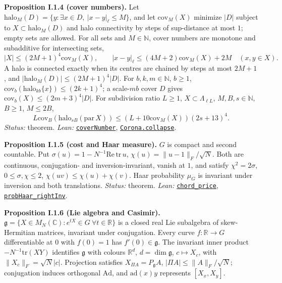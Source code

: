 \documentclass[
  letterpaper,
  11pt]{article}
\begin{document}
\textbf{Proposition I.1.4 (cover numbers).} Let
\(\mathrm{halo}_M(D)=\{y:\exists x\in D,\ |x-y|_\ell\le M\}\), and let
\(\mathrm{cov}_M(X)\) minimize \(|D|\) subject to
\(X\subset\mathrm{halo}_M(D)\) and halo connectivity by steps of
sup-distance at most \(1\); empty sets are allowed. For all sets and
\(M\in\mathbb N\), cover numbers are monotone and subadditive for
intersecting sets,
\[|X|\le(2M+1)^4\mathrm{cov}_M(X),\qquad |x-y|_\ell\le(4M+2)\mathrm{cov}_M(X)+2M\quad(x,y\in X).\]
A halo is connected exactly when its centres are chained by steps at
most \(2M+1\), and \(|\mathrm{halo}_M(D)|\le(2M+1)^4|D|\). For
\(b,k,m\in\mathbb N\), \(b\ge1\),
\(\mathrm{cov}_b(\mathrm{halo}_{kb}\{x\})\le(2k+1)^4\); a scale-\(mb\)
cover \(D\) gives \(\mathrm{cov}_b(X)\le(2m+3)^4|D|\). For subdivision
ratio \(L\ge1\), \(X\subset\Lambda_{\ell L}\), \(M,B,s\in\mathbb N\),
\(B\ge1\), \(M\le2B\),
\[L\mathrm{cov}_B(\mathrm{halo}_{sB}(\mathrm{par}\,X))\le(L+10\mathrm{cov}_M(X))(2s+13)^4.\]
\emph{Status:} theorem. \emph{Lean:}
\href{https://github.com/yang-mills-group/OpenAI-YM-20261028/blob/3456e5e75cf8d4cd558955a5c7638fba2d68f464/YM/Lattice/Support.lean\#L69-L71}{\texttt{coverNumber}},
\href{https://github.com/yang-mills-group/OpenAI-YM-20261028/blob/3456e5e75cf8d4cd558955a5c7638fba2d68f464/YM/Corona/Spend.lean\#L73-L105}{\texttt{Corona.collapse}}.

\textbf{Proposition I.1.5 (cost and Haar measure).} \(G\) is compact and
second countable. Put \(\sigma(u)=1-N^{-1}\mathrm{Re}\,\mathrm{tr}\,u\),
\(\chi(u)=\|u-1\|_F/\sqrt N\). Both are continuous, conjugation- and
inversion-invariant, vanish at \(1\), and satisfy \(\chi^2=2\sigma\),
\(0\le\sigma,\chi\le2\), \(\chi(uv)\le\chi(u)+\chi(v)\). Haar
probability \(\mu_G\) is invariant under inversion and both
translations. \emph{Status:} theorem. \emph{Lean:}
\href{https://github.com/yang-mills-group/OpenAI-YM-20261028/blob/3456e5e75cf8d4cd558955a5c7638fba2d68f464/YM/Gauge/MatrixGroup.lean\#L117-L126}{\texttt{chord\_price}},
\href{https://github.com/yang-mills-group/OpenAI-YM-20261028/blob/3456e5e75cf8d4cd558955a5c7638fba2d68f464/YM/Gauge/MatrixGroup.lean\#L193-L200}{\texttt{probHaar\_rightInv}}.

\textbf{Proposition I.1.6 (Lie algebra and Casimir).}
\(\mathfrak g=\{X\in M_N(\mathbb C):e^{tX}\in G\ \forall t\in\mathbb R\}\)
is a closed real Lie subalgebra of skew-Hermitian matrices, invariant
under conjugation. Every curve \(f:\mathbb R\to G\) differentiable at
\(0\) with \(f(0)=1\) has \(f'(0)\in\mathfrak g\). The invariant inner
product \(-N^{-1}\mathrm{tr}(XY)\) identifies \(\mathfrak g\) with
colours \(\mathbb R^d\), \(d=\dim\mathfrak g\), \(c\mapsto X_c\), with
\(\|X_c\|_F=\sqrt N|c|\). Projection satisfies
\(X_{\Pi A}=P_{\mathfrak g}A\), \(|\Pi A|\le\|A\|_F/\sqrt N\);
conjugation induces orthogonal \(\mathrm{Ad}\), and \(\mathrm{ad}(x)y\)
represents \([X_x,X_y]\).
\end{document}
